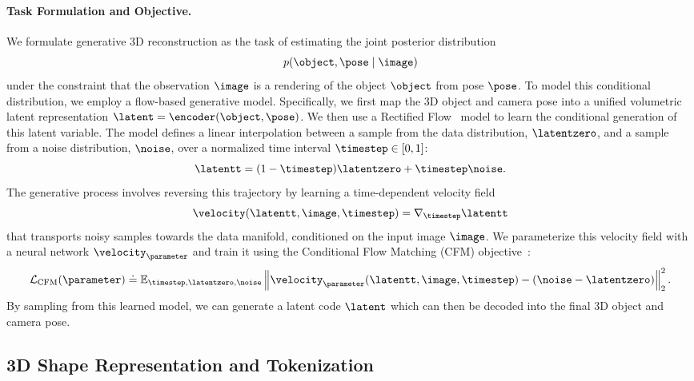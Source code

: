 \documentclass[../../book-main.tex]{subfiles}
\begin{document}
\paragraph{Task Formulation and Objective.}
We formulate generative 3D reconstruction as the task of estimating
the joint posterior distribution
\[
p(\object, \pose \mid \image)
\]
under the constraint that the observation $\image$ is a rendering of
the object $\object$ from pose $\pose$. To model this conditional
distribution, we employ a flow-based generative model. Specifically,
we first map the 3D object and camera pose into a unified volumetric
latent representation
\(\latent = \encoder(\object, \pose)\).
We then use a Rectified Flow~\citep{lipmanflow} model to learn the conditional
generation of this latent variable. The model defines a linear
interpolation between a sample from the data distribution,
$\latentzero$, and a sample from a noise distribution, $\noise$, over
a normalized time interval $\timestep \in [0,1]$:
\begin{equation}
\latentt = (1 - \timestep) \latentzero + \timestep \noise.
\end{equation}
The generative process involves reversing this trajectory by learning
a time-dependent velocity field
\[
\velocity(\latentt, \image, \timestep) = \nabla_{\timestep} \latentt
\]
that transports noisy samples towards the data manifold, conditioned
on the input image $\image$. We parameterize this velocity field with
a neural network $\velocity_{\parameter}$ and train it using the
Conditional Flow Matching (CFM) objective~\cite{lipmanflow}:
\begin{equation}
\mathcal{L}_{\mathrm{CFM}}(\parameter) \doteq \mathbb{E}_{\timestep,
\latentzero, \noise} \left\| \velocity_{\parameter}(\latentt, \image,
\timestep) - (\noise - \latentzero) \right\|_{2}^{2}.
\end{equation}
By sampling from this learned model, we can generate a latent code
$\latent$ which can then be decoded into the final 3D object and camera pose.

\subsection{3D Shape Representation and Tokenization}
\end{document}
